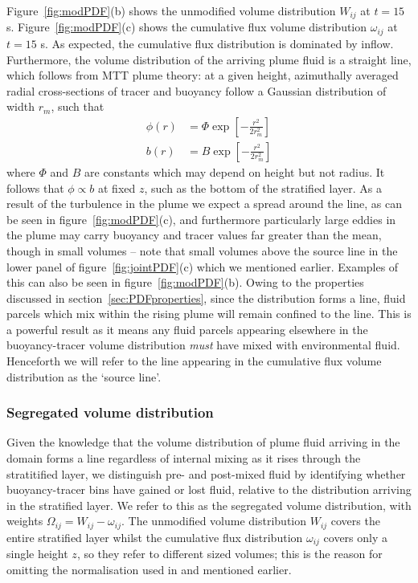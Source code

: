 \documentclass[a4paper]{article}
\begin{document}
Figure~\ref{fig:modPDF}(b) shows the unmodified volume distribution $W_{ij}$ at $t = 15$ s.
Figure~\ref{fig:modPDF}(c) shows the cumulative flux volume distribution $\omega_{ij}$ at $t = 15$ s. As
expected, the cumulative flux distribution is dominated by inflow. Furthermore, the volume distribution of the
arriving plume fluid is a straight line, which follows from MTT plume theory: at a given height, azimuthally
averaged radial cross-sections of tracer and buoyancy follow a Gaussian distribution of width $r_m$, such that
\begin{align}
	\phi(r) &= \Phi \exp \left[ - \frac{r^2}{2r_m^2}\right] \\
	b(r) &= B \exp \left[ - \frac{r^2}{2r_m^2}\right]
\end{align}
where $\Phi$ and $B$ are constants which may depend on height but not radius. It follows that $\phi \propto b$
at fixed $z$, such as the bottom of the stratified layer. As a result of the turbulence in the plume we expect
a spread around the line, as can be seen in figure~\ref{fig:modPDF}(c), and furthermore particularly large
eddies in the plume may carry buoyancy and tracer values far greater than the mean, though in small volumes --
note that small volumes above the source line in the lower panel of figure~\ref{fig:jointPDF}(c) which we
mentioned earlier. Examples of this can also be seen in figure~\ref{fig:modPDF}(b). Owing to the properties
discussed in section~\ref{sec:PDFproperties}, since the distribution forms a line, fluid parcels which mix
within the rising plume will remain confined to the line. This is a powerful result as it means any fluid
parcels appearing elsewhere in the buoyancy-tracer volume distribution \emph{must} have mixed with
environmental fluid. Henceforth we will refer to the line appearing in the cumulative flux volume distribution
as the `source line'.

\subsubsection{Segregated volume distribution}
\label{sec:segjointPDF}

Given the knowledge that the volume distribution of plume fluid arriving in the domain forms a line regardless
of internal mixing as it rises through the stratitified layer, we distinguish pre- and post-mixed fluid by
identifying whether buoyancy-tracer bins have gained or lost fluid, relative to the distribution arriving in
the stratified layer. We refer to this as the segregated volume distribution, with weights $\Omega_{ij} =
W_{ij} - \omega_{ij}$.  The unmodified volume distribution $W_{ij}$ covers the entire stratified layer whilst
the cumulative flux distribution $\omega_{ij}$ covers only a single height $z$, so they refer to different
sized volumes; this is the reason for omitting the normalisation used in \citet{penney2020} and mentioned
earlier.
\end{document}
